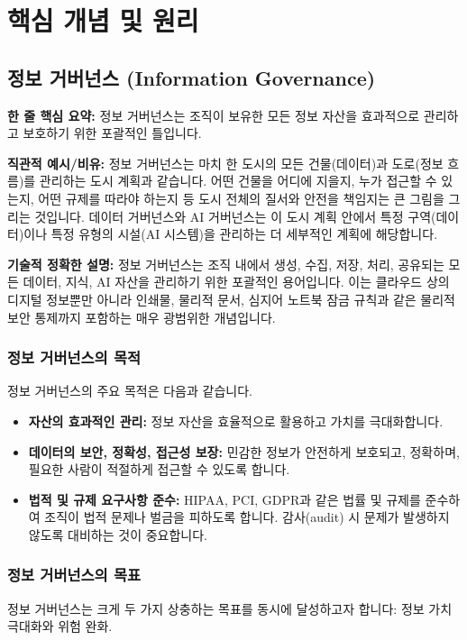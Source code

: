 \documentclass[11pt,a4paper]{article}
\begin{document}
\newpage
\section*{핵심 개념 및 원리}

\subsection*{정보 거버넌스 (Information Governance)}

\begin{keyconceptbox}
\textbf{한 줄 핵심 요약:} 정보 거버넌스는 조직이 보유한 모든 정보 자산을 효과적으로 관리하고 보호하기 위한 포괄적인 틀입니다.
\end{keyconceptbox}

\textbf{직관적 예시/비유:}
정보 거버넌스는 마치 한 도시의 모든 건물(데이터)과 도로(정보 흐름)를 관리하는 도시 계획과 같습니다. 어떤 건물을 어디에 지을지, 누가 접근할 수 있는지, 어떤 규제를 따라야 하는지 등 도시 전체의 질서와 안전을 책임지는 큰 그림을 그리는 것입니다. 데이터 거버넌스와 AI 거버넌스는 이 도시 계획 안에서 특정 구역(데이터)이나 특정 유형의 시설(AI 시스템)을 관리하는 더 세부적인 계획에 해당합니다.

\textbf{기술적 정확한 설명:}
정보 거버넌스는 조직 내에서 생성, 수집, 저장, 처리, 공유되는 모든 데이터, 지식, AI 자산을 관리하기 위한 포괄적인 용어입니다. 이는 클라우드 상의 디지털 정보뿐만 아니라 인쇄물, 물리적 문서, 심지어 노트북 잠금 규칙과 같은 물리적 보안 통제까지 포함하는 매우 광범위한 개념입니다.

\subsubsection*{정보 거버넌스의 목적}
정보 거버넌스의 주요 목적은 다음과 같습니다.
\begin{itemize}
    \item \textbf{자산의 효과적인 관리:} 정보 자산을 효율적으로 활용하고 가치를 극대화합니다.
    \item \textbf{데이터의 보안, 정확성, 접근성 보장:} 민감한 정보가 안전하게 보호되고, 정확하며, 필요한 사람이 적절하게 접근할 수 있도록 합니다.
    \item \textbf{법적 및 규제 요구사항 준수:} HIPAA, PCI, GDPR과 같은 법률 및 규제를 준수하여 조직이 법적 문제나 벌금을 피하도록 합니다. 감사(audit) 시 문제가 발생하지 않도록 대비하는 것이 중요합니다.
\end{itemize}

\subsubsection*{정보 거버넌스의 목표}
정보 거버넌스는 크게 두 가지 상충하는 목표를 동시에 달성하고자 합니다: 정보 가치 극대화와 위험 완화.
\end{document}
